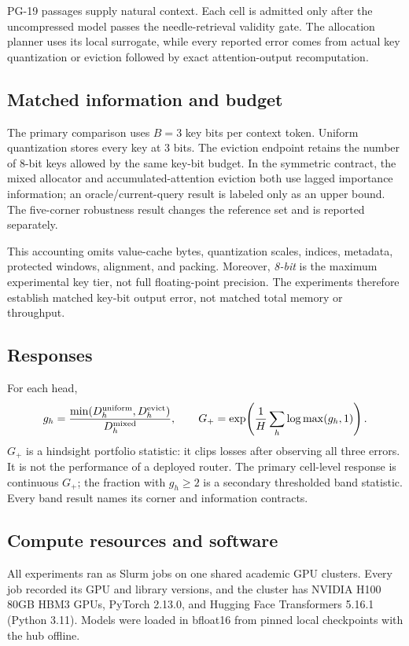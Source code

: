 PG-19 passages supply natural context.  Each cell is admitted only after the
uncompressed model passes the needle-retrieval validity gate.  The allocation
planner uses its local surrogate, while every reported error comes from actual
key quantization or eviction followed by exact attention-output recomputation.

\subsection{Matched information and budget}

The primary comparison uses $B=3$ key bits per context token.  Uniform
quantization stores every key at 3 bits.  The eviction endpoint retains the
number of 8-bit keys allowed by the same key-bit budget.  In the symmetric
contract, the mixed allocator and accumulated-attention eviction both use lagged
importance information; an oracle/current-query result is labeled only as an
upper bound.  The five-corner robustness result changes the reference set and is
reported separately.

This accounting omits value-cache bytes, quantization scales, indices, metadata,
protected windows, alignment, and packing.  Moreover, \emph{8-bit} is the maximum
experimental key tier, not full floating-point precision.  The experiments
therefore establish matched key-bit output error, not matched total memory or
throughput.

\subsection{Responses}

For each head,
\[
 g_h=
 \frac{\min(D_h^{\rm uniform},D_h^{\rm evict})}
 {D_h^{\rm mixed}},
 \qquad
 G_+=\exp\!\left(\frac1H\sum_h\log\max(g_h,1)\right).
\]
$G_+$ is a hindsight portfolio statistic: it clips losses after observing all
three errors.  It is not the performance of a deployed router.  The primary
cell-level response is continuous $G_+$; the fraction with $g_h\ge2$ is a
secondary thresholded band statistic.  Every band result names its corner
and information contracts.

\subsection{Compute resources and software}
\label{app:compute}

All experiments ran as Slurm jobs on one shared academic GPU clusters. 
Every job recorded its GPU and library versions, and the cluster has
NVIDIA H100 80GB HBM3 GPUs, PyTorch 2.13.0, and Hugging Face Transformers
5.16.1 (Python 3.11).  Models were loaded in bfloat16 from pinned local
checkpoints with the hub offline. 

